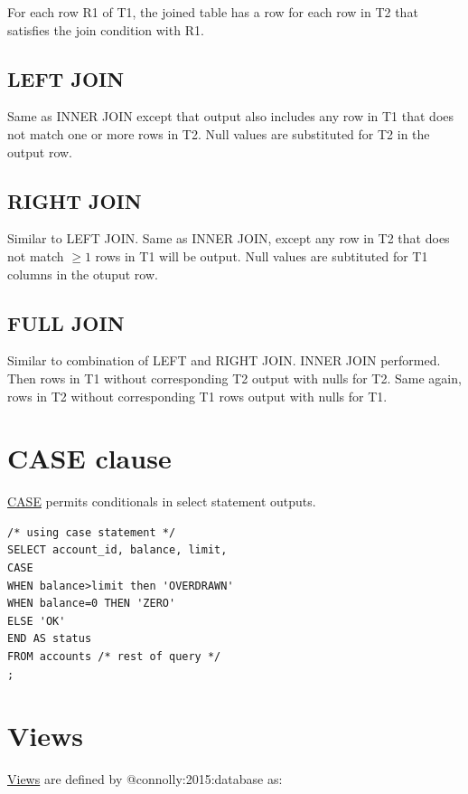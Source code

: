 \documentclass{pgnotes}
\begin{document}
For each row R1 of T1, the joined table has a row for each row in T2
that satisfies the join condition with R1.

\subsection{LEFT JOIN}\label{left-join}

Same as INNER JOIN except that output also includes any row in T1 that
does not match one or more rows in T2. Null values are substituted for
T2 in the output row.

\subsection{RIGHT JOIN}\label{right-join}

Similar to LEFT JOIN. Same as INNER JOIN, except any row in T2 that does
not match \(\ge 1\) rows in T1 will be output. Null values are
subtituted for T1 columns in the otuput row.

\subsection{FULL JOIN}\label{full-join}

Similar to combination of LEFT and RIGHT JOIN. INNER JOIN performed.
Then rows in T1 without corresponding T2 output with nulls for T2. Same
again, rows in T2 without corresponding T1 rows output with nulls for
T1.

\section{CASE clause}\label{case-clause}

\href{https://www.postgresql.org/docs/13/functions-conditional.html\#FUNCTIONS-CASE}{CASE}
permits conditionals in select statement outputs.

\begin{verbatim}
/* using case statement */ 
SELECT account_id, balance, limit,
CASE 
WHEN balance>limit then 'OVERDRAWN' 
WHEN balance=0 THEN 'ZERO' 
ELSE 'OK' 
END AS status
FROM accounts /* rest of query */
;
\end{verbatim}

\section{Views}\label{sec:views}

\href{https://www.postgresql.org/docs/13/tutorial-views.html}{Views} are
defined by @connolly:2015:database as:
\end{document}
